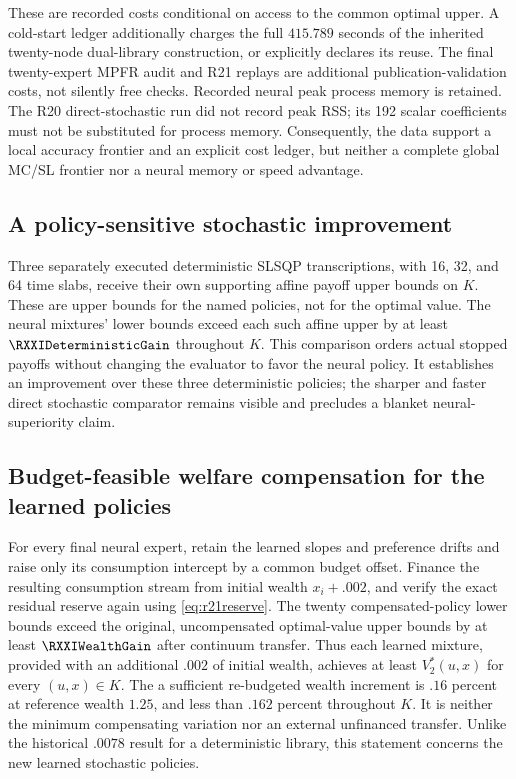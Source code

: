 These are recorded costs conditional on access to the common optimal upper. A cold-start ledger additionally charges the full $415.789$ seconds of the inherited twenty-node dual-library construction, or explicitly declares its reuse. The final twenty-expert MPFR audit and R21 replays are additional publication-validation costs, not silently free checks. Recorded neural peak process memory is retained. The R20 direct-stochastic run did not record peak RSS; its 192 scalar coefficients must not be substituted for process memory. Consequently, the data support a local accuracy frontier and an explicit cost ledger, but neither a complete global MC/SL frontier nor a neural memory or speed advantage.

\subsection{A policy-sensitive stochastic improvement}
Three separately executed deterministic SLSQP transcriptions, with 16, 32, and 64 time slabs, receive their own supporting affine payoff upper bounds on $K$. These are upper bounds for the named policies, not for the optimal value. The neural mixtures' lower bounds exceed each such affine upper by at least $\RXXIDeterministicGain$ throughout $K$. This comparison orders actual stopped payoffs without changing the evaluator to favor the neural policy. It establishes an improvement over these three deterministic policies; the sharper and faster direct stochastic comparator remains visible and precludes a blanket neural-superiority claim.

\subsection{Budget-feasible welfare compensation for the learned policies}
For every final neural expert, retain the learned slopes and preference drifts and raise only its consumption intercept by a common budget offset. Finance the resulting consumption stream from initial wealth $x_i+.002$, and verify the exact residual reserve again using \eqref{eq:r21reserve}. The twenty compensated-policy lower bounds exceed the original, uncompensated optimal-value upper bounds by at least $\RXXIWealthGain$ after continuum transfer. Thus each learned mixture, provided with an additional $.002$ of initial wealth, achieves at least $V_2^*(u,x)$ for every $(u,x)\in K$. The a sufficient re-budgeted wealth increment is $.16$ percent at reference wealth $1.25$, and less than $.162$ percent throughout $K$. It is neither the minimum compensating variation nor an external unfinanced transfer. Unlike the historical $.0078$ result for a deterministic library, this statement concerns the new learned stochastic policies.

